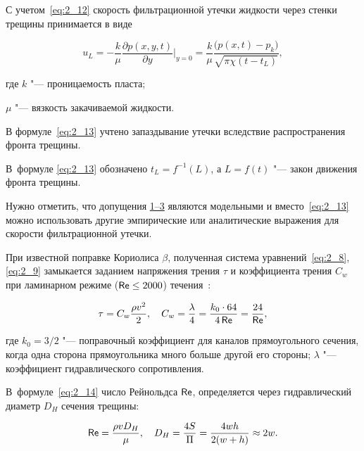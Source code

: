 С учетом~\eqref{eq:2_12} скорость фильтрационной утечки жидкости через стенки трещины принимается в виде

\begin{equation}

u_L =  -\frac{k}{\mu} \frac{\partial p(x, y, t)}{\partial y}\Bigr|_{y=0} = \frac{k}{\mu} \frac{\bigl(p (x, t) - p_k\bigr)}{\sqrt{\pi \chi \left(t-t_L\right)}}, \label{eq:2_13}

\end{equation}

где $k$ "--- проницаемость пласта;

$\mu$  "--- вязкость закачиваемой жидкости. 

В формуле~\eqref{eq:2_13} учтено запаздывание утечки вследствие распространения фронта трещины. 

В~формуле \eqref{eq:2_13} обозначено $t_L = f^{-1} (L)$, а $L= f(t)$  "--- закон движения фронта трещины.



Нужно отметить, что допущения  \hyperlink{bulg:predp1-3}{1–3} являются модельными и вместо~\eqref{eq:2_13} можно использовать другие эмпирические или аналитические выражения для скорости фильтрационной утечки.

При известной поправке Кориолиса $\beta$, полученная система уравнений~\eqref{eq:2_8}, \eqref{eq:2_9} замыкается заданием напряжения трения $\tau$ и коэффициента трения $C_w$ при ламинарном режиме (${\sf Re} \leq 2000$) течения~\cite{Idel4ik1}:

\begin{equation}

\tau = C_w \frac{\rho v^2 }{2} , \quad   C_w  = \frac{\lambda}{4} = \frac{k_0 \cdot 64}{4 \mathop{ \sf Re}} = \frac{24}{\sf Re}, 

\label{eq:2_14}

\end{equation}

где $k_0 = 3/2$ "--- поправочный коэффициент для каналов прямоугольного сечения, когда одна сторона прямоугольника много больше другой его стороны; $\lambda$ "--- коэффициент гидравлического сопротивления. 

В~формуле~\eqref{eq:2_14} число Рейнольдса $\sf Re$, определяется через гидравлический диаметр $D_H$ сечения трещины:

\begin{equation}

{\sf Re} = \frac{\rho v D_H }{\mu} , \quad D_H = \frac{4S}{\Pi} = \frac{4wh }{2 (w+h )} \approx 2w. 

\label{eq:2_15}

\end{equation}



